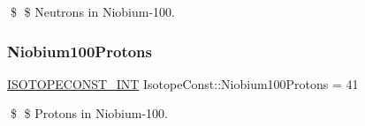 \$ \$ Neutrons in Niobium-\/100. \mbox{\label{group___isotope_const-_niobium-_nb100_ga3f58173c6ca1cf9d66fd851badab0045}} 
\subsubsection{\texorpdfstring{Niobium100\+Protons}{Niobium100Protons}}
{\footnotesize\ttfamily \mbox{\hyperlink{group___isotope_const-_macros_ga5f18360b3e99483a35c32d789e62621c}{I\+S\+O\+T\+O\+P\+E\+C\+O\+N\+S\+T\+\_\+\+I\+NT}} Isotope\+Const\+::\+Niobium100\+Protons = 41}

\$ \$ Protons in Niobium-\/100. 
